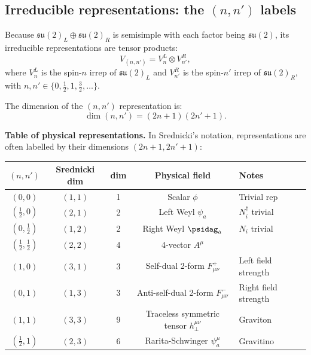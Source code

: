 \subsection{Irreducible representations: the \texorpdfstring{$(n,n')$}{(n,n')} labels}

Because $\mathfrak{su}(2)_L \oplus \mathfrak{su}(2)_R$ is semisimple with
each factor being $\mathfrak{su}(2)$, its irreducible representations
are tensor products:
\begin{equation}
  V_{(n,n')} = V_n^L \otimes V_{n'}^R,
\end{equation}
where $V_n^L$ is the spin-$n$ irrep of $\mathfrak{su}(2)_L$ and
$V_{n'}^R$ is the spin-$n'$ irrep of $\mathfrak{su}(2)_R$,
with $n,n' \in \{0, \tfrac{1}{2}, 1, \tfrac{3}{2}, \ldots\}$.

The dimension of the $(n,n')$ representation is:
\begin{equation}
  \dim(n,n') = (2n+1)(2n'+1).
\end{equation}

\medskip
\noindent\textbf{Table of physical representations.}  In Srednicki's
notation, representations are often labelled by their dimensions
$(2n+1, 2n'+1)$:

\begin{center}
\renewcommand{\arraystretch}{1.45}
\begin{tabular}{@{}ccccl@{}}
  \toprule
  $(n,n')$ & Srednicki dim & dim & Physical field & Notes \\
  \midrule
  $(0,0)$ & $(1,1)$ & 1 & Scalar $\phi$ & Trivial rep \\
  $(\tfrac{1}{2},0)$ & $(2,1)$ & 2 & Left Weyl $\psi_a$ & $N_i^\dagger$ trivial \\
  $(0,\tfrac{1}{2})$ & $(1,2)$ & 2 & Right Weyl $\psidag_{\dot a}$ & $N_i$ trivial \\
  $(\tfrac{1}{2},\tfrac{1}{2})$ & $(2,2)$ & 4 & 4-vector $A^\mu$ & \\
  $(1,0)$ & $(3,1)$ & 3 & Self-dual 2-form $F^+_{\mu\nu}$ & Left field strength \\
  $(0,1)$ & $(1,3)$ & 3 & Anti-self-dual 2-form $F^-_{\mu\nu}$ & Right field strength \\
  $(1,1)$ & $(3,3)$ & 9 & Traceless symmetric tensor $h^{\mu\nu}_\perp$ & Graviton \\
  $(\tfrac{1}{2},1)$ & $(2,3)$ & 6 & Rarita-Schwinger $\psi^\mu_a$ & Gravitino \\
  \bottomrule
\end{tabular}
\end{center}

